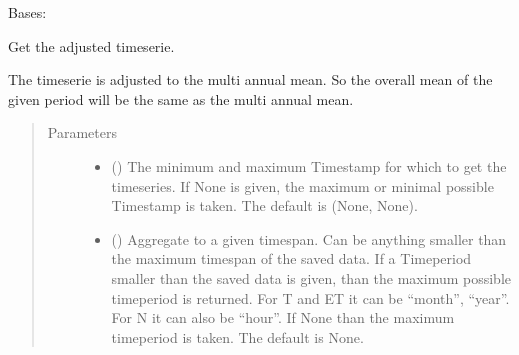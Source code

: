\documentclass[letterpaper,10pt,english]{sphinxmanual}
\begin{document}
\begin{fulllineitems}
\label{\detokenize{weatherDB:weatherDB.station.StationTETBase}}
\sphinxAtStartPar
Bases: {\hyperref[\detokenize{weatherDB:weatherDB.station.StationBase}]{}}

\begin{fulllineitems}
\label{\detokenize{weatherDB:weatherDB.station.StationTETBase.get_adj}}
\sphinxAtStartPar
Get the adjusted timeserie.

\sphinxAtStartPar
The timeserie is adjusted to the multi annual mean.
So the overall mean of the given period will be the same as the multi annual mean.
\begin{quote}\begin{description}
\item[{Parameters}] \leavevmode\begin{itemize}
\item {} 
\sphinxAtStartPar
{} ({\hyperref[\detokenize{weatherDB.lib:weatherDB.lib.utils.TimestampPeriod}]{}}\sphinxstyleliteralemphasis{\sphinxupquote{(}}\sphinxstyleliteralemphasis{\sphinxupquote{)}}\sphinxstyleliteralemphasis{\sphinxupquote{, }}) \textendash{} The minimum and maximum Timestamp for which to get the timeseries.
If None is given, the maximum or minimal possible Timestamp is taken.
The default is (None, None).

\item {} 
\sphinxAtStartPar
{} (\sphinxstyleliteralemphasis{\sphinxupquote{, }}) \textendash{} Aggregate to a given timespan.
Can be anything smaller than the maximum timespan of the saved data.
If a Timeperiod smaller than the saved data is given, than the maximum possible timeperiod is returned.
For T and ET it can be “month”, “year”.
For N it can also be “hour”.
If None than the maximum timeperiod is taken.
The default is None.


\end{itemize}
\end{description}
\end{quote}
\end{fulllineitems}
\end{fulllineitems}
\end{document}
